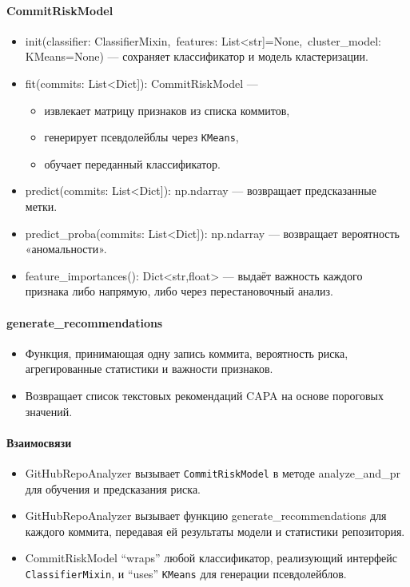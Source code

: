 \paragraph{CommitRiskModel}
\begin{itemize}
	\item { init(classifier: ClassifierMixin,\ features: List<str]=None,\ cluster\_model: KMeans=None)} — сохраняет классификатор и модель кластеризации.
	\item { fit(commits: List<Dict]): CommitRiskModel} — 
	\begin{itemize}
		\item извлекает матрицу признаков из списка коммитов,
		\item генерирует псевдолейблы через \texttt{KMeans},
		\item обучает переданный классификатор.
	\end{itemize}
	\item { predict(commits: List<Dict]): np.ndarray} — возвращает предсказанные метки.
	\item { predict\_proba(commits: List<Dict]): np.ndarray} — возвращает вероятность «аномальности».
	\item { feature\_importances(): Dict<str,float>} — выдаёт важность каждого признака либо напрямую, либо через перестановочный анализ.
\end{itemize}

\paragraph{generate\_recommendations}
\begin{itemize}
	\item Функция, принимающая одну запись коммита, вероятность риска, агрегированные статистики и важности признаков.
	\item Возвращает список текстовых рекомендаций CAPA на основе пороговых значений.
\end{itemize}

\paragraph{Взаимосвязи}
\begin{itemize}
	\item { GitHubRepoAnalyzer} вызывает \texttt{CommitRiskModel} в методе { analyze\_and\_pr} для обучения и предсказания риска.
	\item { GitHubRepoAnalyzer} вызывает функцию { generate\_recommendations} для каждого коммита, передавая ей результаты модели и статистики репозитория.
	\item { CommitRiskModel} “wraps” любой классификатор, реализующий интерфейс \texttt{ClassifierMixin}, и “uses” \texttt{KMeans} для генерации псевдолейблов.
\end{itemize}

